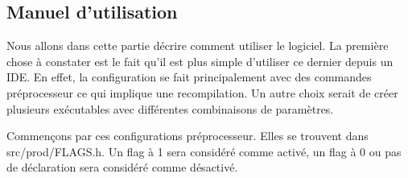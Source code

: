 \documentclass[hideweeklyreports]{polytech/polytech}
\begin{document}
			\subsection{Manuel d'utilisation}
				Nous allons dans cette partie décrire comment utiliser le logiciel. La première chose à constater est le fait qu'il est plus simple d'utiliser ce dernier depuis un IDE. En effet, la configuration se fait principalement avec des commandes préprocesseur ce qui implique une recompilation. Un autre choix serait de créer plusieurs exécutables avec différentes combinaisons de paramètres.
				
				Commençons par ces configurations préprocesseur. Elles se trouvent dans src/prod/FLAGS.h. Un flag à 1 sera considéré comme activé, un flag à 0 ou pas de déclaration sera considéré comme désactivé.
				
\end{document}
